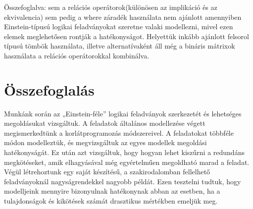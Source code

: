 \documentclass[12pt,a4paper,twoside, openright]{report}
\begin{document}
    Összefoglalva: sem a relációs operátorok(különösen az implikáció és az ekvivalencia) sem pedig a where záradék használata nem ajánlott amennyiben Einstein-típusú logikai feladványokat szeretne valaki modellezni, mivel ezen elemek meglehetősen rontják a hatékonyságot.
    Helyettük inkább ajánlott felsorol típusú tömbök használata, illetve alternatívaként áll még a bináris mátrixok használata a relációs operátorokkal kombinálva.


\chapter{Összefoglalás}

    Munkánk során az „Einstein-féle” logikai feladványok szerkezetét és lehetséges megoldásukat vizsgáltuk.
    A feladatok általános modellezése végett megismerkedtünk a korlátprogramozás módszereivel.
    A feladatokat többféle módon modelleztük, és megvizsgáltuk az egyes modellek megoldási hatékonyságát.
    Ez után azt vizsgáltuk, hogy hogyan lehet kiszűrni a redundáns megkötéseket, amik elhagyásával még egyértelműen megoldható marad a feladat.
    Végül létrehoztunk egy saját készítésű, a szakirodalomban fellelhető feladványoknál nagyságrendekkel nagyobb példát.
    Ezen tesztelni tudtuk, hogy modelljeink mennyire bizonyulnak hatékonynak abban az esetben, ha a tulajdonságok és kikötések számát drasztikus mértékben emeljük meg.




\end{document}
